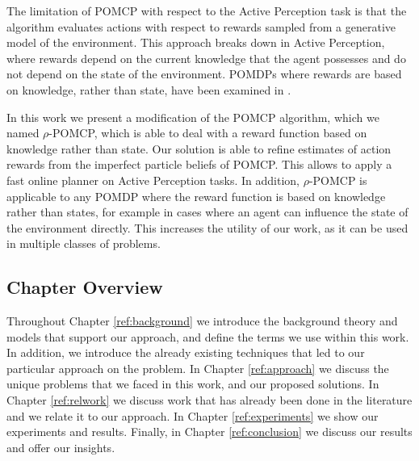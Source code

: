The limitation of POMCP with respect to the Active Perception task is that the algorithm evaluates
actions with respect to rewards sampled from a generative model of the environment. This approach
breaks down in Active Perception, where rewards depend on the current knowledge that the agent
possesses and do not depend on the state of the environment. POMDPs where rewards are based on
knowledge, rather than state, have been examined in \cite{cit:rpomdp}.

In this work we present a modification of the POMCP algorithm, which we named $\rho$-POMCP, which is
able to deal with a reward function based on knowledge rather than state. Our solution is able to
refine estimates of action rewards from the imperfect particle beliefs of POMCP. This allows to
apply a fast online planner on Active Perception tasks. In addition, $\rho$-POMCP is applicable to
any POMDP where the reward function is based on knowledge rather than states, for example in cases
where an agent can influence the state of the environment directly. This increases the utility of
our work, as it can be used in multiple classes of problems.

\subsection{Chapter Overview}

Throughout Chapter \ref{ref:background} we introduce the background theory and models that support
our approach, and define the terms we use within this work. In addition, we introduce the already
existing techniques that led to our particular approach on the problem. In Chapter
\ref{ref:approach} we discuss the unique problems that we faced in this work, and our proposed
solutions. In Chapter \ref{ref:relwork} we discuss work that has already been done in the literature
and we relate it to our approach. In Chapter \ref{ref:experiments} we show our experiments and
results. Finally, in Chapter \ref{ref:conclusion} we discuss our results and offer our insights.

